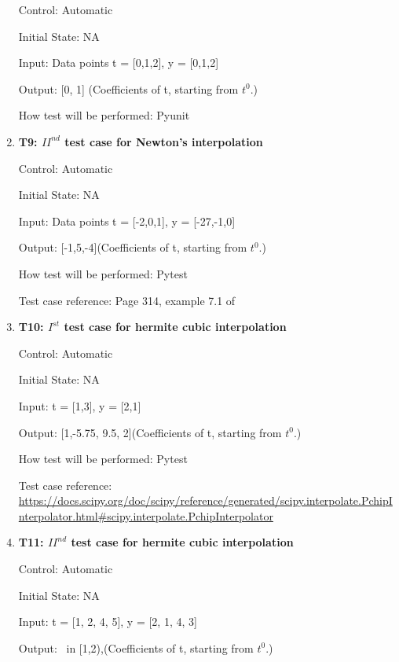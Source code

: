 \documentclass[12pt, titlepage]{article}
\begin{document}
\begin{enumerate}
Control: Automatic 

Initial State: NA

Input: Data points t = [0,1,2], y = [0,1,2]

Output: [0, 1] (Coefficients of t, starting from $t^{0}$.)

How test will be performed: Pyunit\\


\item{\textbf{T9: ${II}^{nd}$ test case for Newton's interpolation} \\}

Control: Automatic

Initial State: NA

Input: Data points t = [-2,0,1], y = [-27,-1,0]

Output: [-1,5,-4](Coefficients of t, starting from $t^{0}$.)

How test will be performed: Pytest

Test case reference: Page 314, example 7.1 of \cite{Health1997}\\




\item{\textbf{T10: $I^{st}$ test case for hermite cubic interpolation }\\}

Control: Automatic 

Initial State: NA

Input: t = [1,3], y = [2,1]

Output: [1,-5.75, 9.5, 2](Coefficients of t, starting from $t^{0}$.)


How test will be performed: Pytest

Test case reference: \url{https://docs.scipy.org/doc/scipy/reference/generated/scipy.interpolate.PchipInterpolator.html#scipy.interpolate.PchipInterpolator}\\


\item{\textbf{T11: ${II}^{nd}$ test case for hermite cubic interpolation} \\}

Control: Automatic 

Initial State: NA

Input: t = [1, 2, 4, 5], y = [2, 1, 4, 3]

Output: 
~\newline [1.0,1.0, 1.38888889, 2.0] in [1,2),(Coefficients of t, starting from $t^{0}$.)


\end{enumerate}
\end{document}
